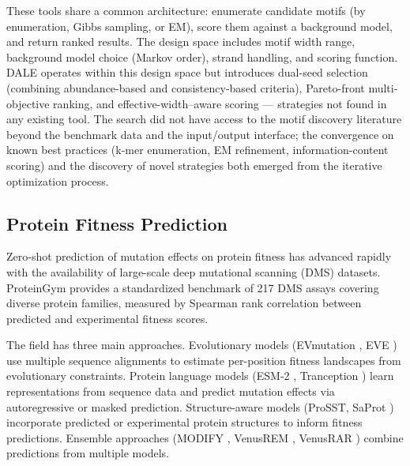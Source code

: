 \documentclass[11pt,a4paper]{article}
\begin{document}
These tools share a common architecture: enumerate candidate motifs (by enumeration, Gibbs sampling, or EM), score them against a background model, and return ranked results. The design space includes motif width range, background model choice (Markov order), strand handling, and scoring function. DALE operates within this design space but introduces dual-seed selection (combining abundance-based and consistency-based criteria), Pareto-front multi-objective ranking, and effective-width--aware scoring --- strategies not found in any existing tool. The search did not have access to the motif discovery literature beyond the benchmark data and the input/output interface; the convergence on known best practices (k-mer enumeration, EM refinement, information-content scoring) and the discovery of novel strategies both emerged from the iterative optimization process.

\subsection{Protein Fitness Prediction}

Zero-shot prediction of mutation effects on protein fitness has advanced rapidly with the availability of large-scale deep mutational scanning (DMS) datasets. ProteinGym \citep{notin2023proteingym} provides a standardized benchmark of 217 DMS assays covering diverse protein families, measured by Spearman rank correlation between predicted and experimental fitness scores.

The field has three main approaches. Evolutionary models (EVmutation \citep{hopf2017evmutation}, EVE \citep{frazer2021eve}) use multiple sequence alignments to estimate per-position fitness landscapes from evolutionary constraints. Protein language models (ESM-2 \citep{lin2023esm2}, Tranception \citep{notin2023proteingym}) learn representations from sequence data and predict mutation effects via autoregressive or masked prediction. Structure-aware models (ProSST, SaProt \citep{su2023saprot}) incorporate predicted or experimental protein structures to inform fitness predictions. Ensemble approaches (MODIFY \citep{zhang2024modify}, VenusREM \citep{marquet2024vesp}, VenusRAR \citep{tan2026venusrar}) combine predictions from multiple models.
\end{document}
